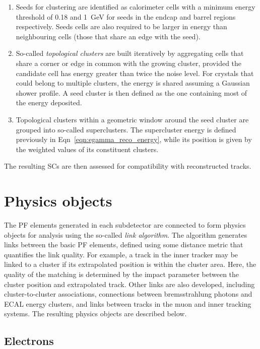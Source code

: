 \begin{enumerate}
    \item Seeds for clustering are identified as calorimeter cells with a minimum energy threshold of 0.18 and 1~GeV for seeds in the endcap and barrel regions respectively. Seeds cells are also required to be larger in energy than neighbouring cells (those that share an edge with the seed).
    \item So-called \textit{topological clusters} are built iteratively by aggregating cells that share a corner or edge in common with the growing cluster, provided the candidate cell has energy greater than twice the noise level. For crystals that could belong to multiple clusters, the energy is shared assuming a Gaussian shower profile. A seed cluster is then defined as the one containing most of the energy deposited.
    \item Topological clusters within a geometric window around the seed cluster are grouped into so-called superclusters. The supercluster energy is defined previously in Eqn~\ref{eqn:egamma_reco_energy}, while its position is given by the \pt weighted values of its constituent clusters. 
\end{enumerate}

\noindent The resulting SCs are then assessed for compatibility with reconstructed tracks.


\section{Physics objects}


The PF elements generated in each subdetector are connected to form physics objects for analysis using the so-called \textit{link algorithm}. The algorithm generates links between the basic PF elements, defined using some distance metric that quantifies the link quality. For example, a track in the inner tracker may be linked to a cluster if its extrapolated position is within the cluster area. Here, the quality of the matching is determined by the impact parameter between the cluster position and extrapolated track. Other links are also developed, including cluster-to-cluster associations, connections between bremsstrahlung photons and ECAL energy clusters, and links between tracks in the muon and inner tracking systems. The resulting physics objects are described below. %

\subsection{Electrons}
\label{subsec:elec_reco}

